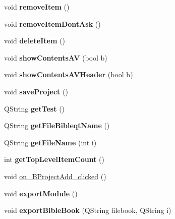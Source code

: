 \begin{DoxyCompactItemize}
\item 
\hypertarget{classHelpDialog_a85061c20d0cbfa403c28dc18726a7082}{
void {\bfseries removeItem} ()}
\label{classHelpDialog_a85061c20d0cbfa403c28dc18726a7082}

\item 
\hypertarget{classHelpDialog_ae45e2c494caf3ea6457edcd60136f867}{
void {\bfseries removeItemDontAsk} ()}
\label{classHelpDialog_ae45e2c494caf3ea6457edcd60136f867}

\item 
\hypertarget{classHelpDialog_ad14227a94982341cc99fb360b4f31f88}{
void {\bfseries deleteItem} ()}
\label{classHelpDialog_ad14227a94982341cc99fb360b4f31f88}

\item 
\hypertarget{classHelpDialog_acd07583d1ad39499872d7d95f0c45619}{
void {\bfseries showContentsAV} (bool b)}
\label{classHelpDialog_acd07583d1ad39499872d7d95f0c45619}

\item 
\hypertarget{classHelpDialog_a61ae0566435cb7a7e04107994ee332cb}{
void {\bfseries showContentsAVHeader} (bool b)}
\label{classHelpDialog_a61ae0566435cb7a7e04107994ee332cb}

\item 
\hypertarget{classHelpDialog_a7d01b53eca43479d4a34beb07ad45dd9}{
void {\bfseries saveProject} ()}
\label{classHelpDialog_a7d01b53eca43479d4a34beb07ad45dd9}

\item 
\hypertarget{classHelpDialog_a703fd2f9a1537091692040e1175e142d}{
QString {\bfseries getTest} ()}
\label{classHelpDialog_a703fd2f9a1537091692040e1175e142d}

\item 
\hypertarget{classHelpDialog_a36a589b767a057c439ff03db5edac213}{
QString {\bfseries getFileBibleqtName} ()}
\label{classHelpDialog_a36a589b767a057c439ff03db5edac213}

\item 
\hypertarget{classHelpDialog_af094459cdf29a3048ac18a0de5c5e21c}{
QString {\bfseries getFileName} (int i)}
\label{classHelpDialog_af094459cdf29a3048ac18a0de5c5e21c}

\item 
\hypertarget{classHelpDialog_af4c53f338241e423f816062fe9b95adb}{
int {\bfseries getTopLevelItemCount} ()}
\label{classHelpDialog_af4c53f338241e423f816062fe9b95adb}

\item 
void \hyperlink{classHelpDialog_a9fdb42795aaddf5046df8be9f3790e80}{on\_\-BProjectAdd\_\-clicked} ()
\item 
\hypertarget{classHelpDialog_abb5fb867da8bf8b4533fb914d5901917}{
void {\bfseries exportModule} ()}
\label{classHelpDialog_abb5fb867da8bf8b4533fb914d5901917}

\item 
\hypertarget{classHelpDialog_aa8098352c639e4cbf96ee1eedf53c36b}{
void {\bfseries exportBibleBook} (QString filebook, QString i)}
\label{classHelpDialog_aa8098352c639e4cbf96ee1eedf53c36b}

\end{DoxyCompactItemize}
